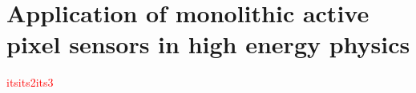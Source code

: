 %
\chapter{Application of monolithic active pixel sensors in high energy physics}
\label{chap:application-maps}
%
\textcolor{red}{\blindtext}
\textcolor{red}{\gls{its}\gls{its2}\gls{its3}}
